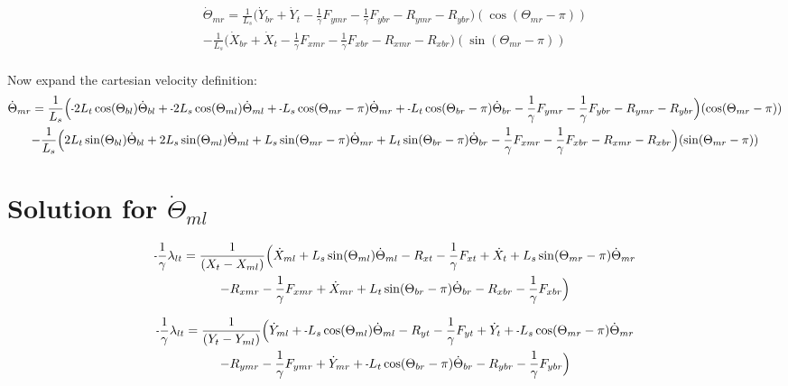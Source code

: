 \documentclass[11pt, landscape]{article}
\newcommand{\mn}{\scalebox{0.7}[1.0]{-}}
\begin{document}
\begin{multline}
\dot{\Theta}_{mr} =
\frac{1}{L_{s}} \Big(\dot{Y}_{br} + \dot{Y}_{t } - \frac{1}{\gamma}F_{ymr} - \frac{1}{\gamma}F_{ybr} - R_{ymr} - R_{ybr} \Big)(\cos(\Theta_{mr}-\pi))\\
  - \frac{1}{L_{s}}\Big(\dot{X}_{br} + \dot{X}_{t } - \frac{1}{\gamma}F_{xmr} - \frac{1}{\gamma}F_{xbr} - R_{xmr} - R_{xbr} \Big)(\sin(\Theta_{mr}-\pi))
\end{multline}
\\
Now expand the cartesian velocity definition: \\

\begin{multline}
\dot{\Theta}_{mr} =
\frac{1}{L_{s}} \Big(\mn 2L_{t}\cos(\Theta_{bl})\dot{\Theta}_{bl} + \mn 2L_{s}\cos(\Theta_{ml})\dot{\Theta}_{ml} + \mn L_{s}\cos(\Theta_{mr}-\pi)\dot{\Theta}_{mr} + \mn L_{t}\cos(\Theta_{br}-\pi)\dot{\Theta}_{br}
  - \frac{1}{\gamma}F_{ymr} - \frac{1}{\gamma}F_{ybr} - R_{ymr} - R_{ybr} \Big)(\cos(\Theta_{mr}-\pi))\\
  - \frac{1}{L_{s}}\Big(2L_{t}\sin(\Theta_{bl})\dot{\Theta}_{bl} + 2L_{s}\sin(\Theta_{ml})\dot{\Theta}_{ml} + L_{s}\sin(\Theta_{mr}-\pi)\dot{\Theta}_{mr} + L_{t}\sin(\Theta_{br}-\pi)\dot{\Theta}_{br}
   - \frac{1}{\gamma}F_{xmr} - \frac{1}{\gamma}F_{xbr} - R_{xmr} - R_{xbr} \Big)(\sin(\Theta_{mr}-\pi))
\end{multline}


\section{Solution for $\dot{\Theta}_{ml}$}

\begin{multline}
\mn\frac{1}{\gamma}\lambda_{lt} =
\frac{1}{(X_{t } - X_{ml})} \Big( \dot{X}_{ml} + L_{s}\sin(\Theta_{ml})      \dot{\Theta}_{ml} - R_{xt } - \frac{1}{\gamma}F_{xt } + \dot{X}_{t } + L_{s}\sin(\Theta_{mr}-\pi)  \dot{\Theta}_{mr} \\
- R_{xmr} - \frac{1}{\gamma}F_{xmr} + \dot{X}_{mr} + L_{t}\sin(\Theta_{br}-\pi)  \dot{\Theta}_{br} - R_{xbr} - \frac{1}{\gamma}F_{xbr} \Big)
\end{multline}

\begin{multline}
\mn\frac{1}{\gamma}\lambda_{lt} =
\frac{1}{(Y_{t } - Y_{ml})} \Big( \dot{Y}_{ml} + \mn L_{s}\cos(\Theta_{ml})      \dot{\Theta}_{ml} - R_{yt} - \frac{1}{\gamma}F_{yt } + \dot{Y}_{t } + \mn L_{s}\cos(\Theta_{mr}-\pi)  \dot{\Theta}_{mr} \\
- R_{ymr} - \frac{1}{\gamma}F_{ymr} + \dot{Y}_{mr} + \mn L_{t}\cos(\Theta_{br}-\pi)  \dot{\Theta}_{br} - R_{ybr} - \frac{1}{\gamma}F_{ybr}\Big)
\end{multline}
\end{document}
